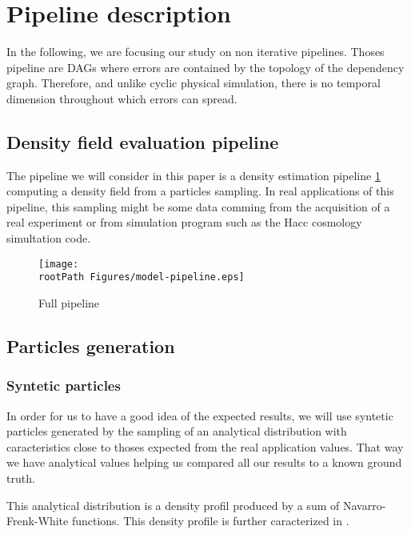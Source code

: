 \documentclass[10pt,a4paper,twoside,twocolumn]{article}
\newcommand*{\rootPath}{../}
\begin{document}
\section{Pipeline description}

In the following, we are focusing our study on non iterative pipelines. Thoses
pipeline are DAGs where errors are contained by the topology of the dependency
graph. Therefore, and unlike cyclic physical simulation, there is no temporal
dimension throughout which errors can spread.




\subsection{Density field evaluation pipeline}



The pipeline we will consider in this paper is a density estimation pipeline
\ref{fig:pipeline} computing a density field from a particles sampling. In real
applications of this pipeline, this sampling might be some data comming from the
acquisition of a real experiment or from simulation program such as the Hacc
cosmology simultation code.

\begin{figure}[!ht]
	\centering
	\texttt{[image: \\rootPath Figures/model-pipeline.eps]}
	\caption{Full pipeline}
	\label{fig:pipeline}
\end{figure}

\subsection{Particles generation}

\subsubsection{Syntetic particles}

In order for us to have a good idea of the expected results, we will use
syntetic particles generated by the sampling of an analytical distribution with
caracteristics close to thoses expected from the real application values. That
way we have analytical values helping us compared all our results to a known
ground truth.

This analytical distribution is a density profil produced by a sum of
Navarro-Frenk-White functions\cite{navarro96}. This density profile is further
caracterized in .
\end{document}
